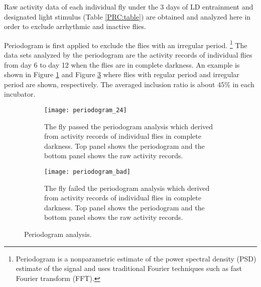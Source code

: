 \documentclass[11pt, onecolumn]{IEEEtran}
\begin{document}
Raw activity data of each individual fly under the 3 days of LD entrainment and designated light stimulus (Table \ref{PRC:table}) are obtained and analyzed here in order to exclude arrhythmic and inactive flies.

Periodogram is first applied to exclude the flies with an irregular period. \footnote{Periodogram is a nonparametric estimate of the power spectral density (PSD) estimate of the signal and uses traditional Fourier techniques such as fast Fourier transform (FFT).} The data sets analyzed by the periodogram are the activity records of individual flies from day 6 to day 12 when the flies are in complete darkness. An example is shown in Figure \ref{periodogram_24:fig} and Figure \ref{periodogram_bad:fig} where flies with regular period and irregular period are shown, respectively. The averaged inclusion ratio is about $45\%$ in each incubator.

\begin{figure}
        \centering
        \begin{subfigure}[t]{0.45\textwidth}
                \texttt{[image: periodogram\_24]}
                \caption{The fly passed the periodogram analysis which derived from activity records of individual flies in complete darkness. Top panel shows the periodogram and the bottom panel shows the raw activity records.\label{periodogram_24:fig}}
        \end{subfigure}
        \qquad
        \begin{subfigure}[t]{0.45\textwidth}
                \texttt{[image: periodogram\_bad]}
                \caption{The fly failed the periodogram analysis which derived from activity records of individual flies in complete darkness. Top panel shows the periodogram and the bottom panel shows the raw activity records.\label{periodogram_bad:fig}}
        \end{subfigure}
        \caption{Periodogram analysis.}
\end{figure}



\end{document}
